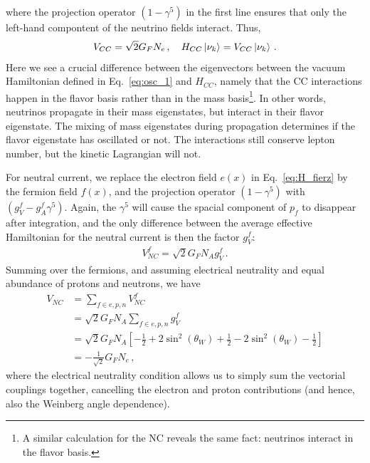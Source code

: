 where the projection operator $(1- \gamma^5)$ in the first line ensures that only the left-hand compontent of the neutrino fields interact. Thus,
\begin{align}\label{eq:V_CC1}
    V_{CC} = \sqrt{2}G_F N_e\,, \quad H_{CC}\ket{\nu_k} = V_{CC}\ket{\nu_k}\,.
\end{align}
Here we see a crucial difference between the eigenvectors between the vacuum Hamiltonian defined in Eq.~\ref{eq:osc_1} and $H_{CC}$, namely
that the CC interactions happen in the flavor basis rather than in the mass basis\footnote{A similar calculation for the NC reveals the same fact:
neutrinos interact in the flavor basis.}. In other words,
neutrinos propagate in their mass eigenstates, but interact in their flavor eigenstate. The mixing of mass eigenstates during propagation
determines if the flavor eigenstate has oscillated or not. The interactions still conserve lepton number, but the kinetic Lagrangian will not.

For neutral current, we replace the electron field $e(x)$ in Eq.~\ref{eq:H_fierz} by the fermion field $f(x)$, and the projection operator 
$(1-\gamma^5)$ with $(g_V^f - g_A^f\gamma^5)$. Again, the $\gamma^5$ will cause the spacial component of $p_f$ to disappear after integration, and the 
only difference between the average effective Hamiltonian for the neutral current is then the factor $g_V^f$:
\begin{align}
    V^f_{NC} = \sqrt{2}G_F N_A g_V^f\,.
\end{align}
Summing over the fermions, and assuming electrical neutrality and equal abundance of protons and neutrons, we have
\begin{align}
    V_{NC} &= \sum_{f \in {e,p,n}} V^f_{NC} \nonumber \\
           &= \sqrt{2}G_F N_A \sum_{f \in {e,p,n}} g_V^f \nonumber \\
           &= \sqrt{2}G_F N_A\left[ -\frac{1}{2}+2\sin^2{(\theta_W)} + \frac{1}{2}-2\sin^2{(\theta_W)} -\frac{1}{2} \right] \nonumber \\
           &= -\frac{1}  {\sqrt{2}} G_F N_e\,,
\end{align}
where the electrical neutrality condition allows us to simply sum the vectorial couplings together, cancelling the electron and proton contributions (and hence, also the Weinberg angle dependence).


